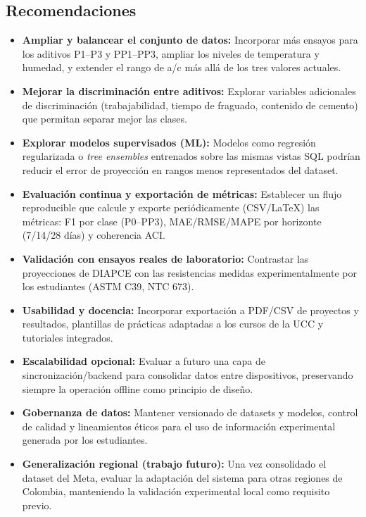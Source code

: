 \documentclass[12pt, letterpaper]{article}
\begin{document}
\subsection{Recomendaciones}

\begin{itemize}
  \item \textbf{Ampliar y balancear el conjunto de datos:} Incorporar más ensayos para los aditivos P1--P3 y PP1--PP3, ampliar los niveles de temperatura y humedad, y extender el rango de a/c más allá de los tres valores actuales.

  \item \textbf{Mejorar la discriminación entre aditivos:} Explorar variables adicionales de discriminación (trabajabilidad, tiempo de fraguado, contenido de cemento) que permitan separar mejor las clases.

  \item \textbf{Explorar modelos supervisados (ML):} Modelos como regresión regularizada o \textit{tree ensembles} entrenados sobre las mismas vistas SQL podrían reducir el error de proyección en rangos menos representados del dataset.

  \item \textbf{Evaluación continua y exportación de métricas:} Establecer un flujo reproducible que calcule y exporte periódicamente (CSV/\LaTeX) las métricas: F1 por clase (P0--PP3), MAE/RMSE/MAPE por horizonte (7/14/28 días) y coherencia ACI.

  \item \textbf{Validación con ensayos reales de laboratorio:} Contrastar las proyecciones de DIAPCE con las resistencias medidas experimentalmente por los estudiantes (ASTM C39, NTC 673).

  \item \textbf{Usabilidad y docencia:} Incorporar exportación a PDF/CSV de proyectos y resultados, plantillas de prácticas adaptadas a los cursos de la UCC y tutoriales integrados.

  \item \textbf{Escalabilidad opcional:} Evaluar a futuro una capa de sincronización/backend para consolidar datos entre dispositivos, preservando siempre la operación offline como principio de diseño.

  \item \textbf{Gobernanza de datos:} Mantener versionado de datasets y modelos, control de calidad y lineamientos éticos para el uso de información experimental generada por los estudiantes.

  \item \textbf{Generalización regional (trabajo futuro):} Una vez consolidado el dataset del Meta, evaluar la adaptación del sistema para otras regiones de Colombia, manteniendo la validación experimental local como requisito previo.
\end{itemize}
\end{document}
